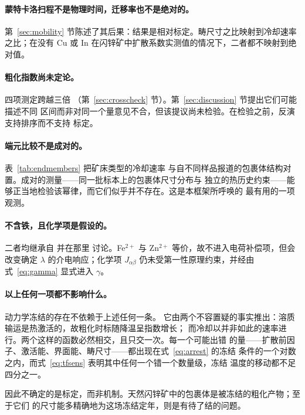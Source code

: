 \documentclass[11pt,a4paper]{ctexart}
\begin{document}
\paragraph{蒙特卡洛扫程不是物理时间，迁移率也不是绝对的。}
第~\ref{sec:mobility} 节陈述了其后果：结果是相对标定。畴尺寸之比映射到冷却速率
之比；在没有 Cu 或 In 在闪锌矿中扩散系数实测值的情况下，二者都不映射到绝对值。

\paragraph{粗化指数尚未定论。} 四项测定跨越三倍
（第~\ref{sec:crosscheck} 节）。第~\ref{sec:discussion} 节提出它们可能描述不同
区间而非对同一个量意见不合，但该提议尚未检验。在检验之前，反演支持排序而不支持
标定。

\paragraph{端元比较不是成对的。} 表~\ref{tab:endmembers} 把矿床类型的冷却速率
与自不同样品报道的包裹体结构对置。成对的测量——同一批标本上的包裹体尺寸分布与
独立的热历史约束——能够正当地检验该幂律，而它们似乎并不存在。这是本框架所呼唤的
最有用的一项观测。

\paragraph{不含铁，且化学项是假设的。} 二者均继承自 \citet{yu2026} 并在那里
讨论。Fe$^{2+}$ 与 Zn$^{2+}$ 等价，故不进入电荷补偿项，但会改变确定 $\lambda$
的介电响应；化学项 $J_{\alpha\beta}$ 仍未受第一性原理约束，并经由
式~\eqref{eq:gamma} 显式进入 $\gamma$。

\paragraph{以上任何一项都不影响什么。} 动力学冻结的存在不依赖于上述任何一条。
它由两个不容置疑的事实推出：溶质输运是热激活的，故粗化时标随降温呈指数增长；
而冷却以并非如此的速率进行。两个这样的函数必然相交，且只交一次。每一个可能出错
的量——扩散前因子、激活能、界面能、畴尺寸——都出现在式~\eqref{eq:arrest} 的冻结
条件的一个对数之内，而式~\eqref{eq:tfsens} 表明其中任何一个错一个数量级，冻结
温度的移动都不足四分之一。

因此不确定的是标定，而非机制。天然闪锌矿中的包裹体是被冻结的粗化产物；至于它们
的尺寸能多精确地为这场冻结定年，则是有待了结的问题。

\end{document}

